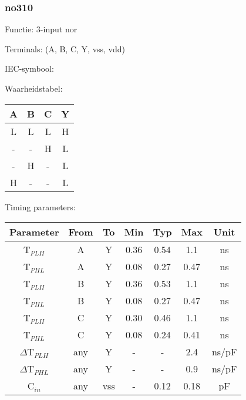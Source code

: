 \subsubsection{no310}

Functie: 3-input nor

Terminals: (A, B, C, Y, vss, vdd)


IEC-symbool:
\begin{figure}[bth]
\end{figure}

\begin{minipage}[t]{0.3\textwidth}
Waarheidstabel:\\

\begin{tabular}{|c|c|c||c|}
\hline
A	&B	&C	&Y\\
\hline
L	&L	&L	&H\\
-	&-	&H	&L\\
-	&H	&-	&L\\
H	&-	&-	&L\\
\hline
\end{tabular}
\end{minipage}
\hfill
\begin{minipage}[t]{0.6\textwidth}
Timing parameters:\\

\begin{tabular}{|c|cc|ccc|c|}
\hline
Parameter               &From           &To   &Min	&Typ 	&Max    &Unit\\
\hline
T$_{PLH}$               &A     		&Y    &0.36	&0.54  	&1.1    &ns\\
T$_{PHL}$               &A    		&Y    &0.08  	&0.27	&0.47   &ns\\
T$_{PLH}$               &B     		&Y    &0.36  	&0.53  	&1.1  	&ns\\
T$_{PHL}$               &B    		&Y    &0.08	&0.27	&0.47	&ns\\
T$_{PLH}$               &C     		&Y    &0.30	&0.46 	&1.1   	&ns\\
T$_{PHL}$               &C    		&Y    &0.08  	&0.24	&0.41 	&ns\\
\hline
$\Delta$T$_{PLH}$       &any          	&Y    &-	&-	&2.4    &ns/pF\\
$\Delta$T$_{PHL}$       &any           	&Y    &-	&-  	&0.9    &ns/pF\\
\hline
C$_{in}$                &any	    	&vss  &-  	&0.12	&0.18   &pF\\
\hline
\end{tabular}
\end{minipage}
\\

